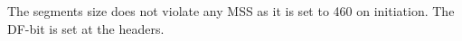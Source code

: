 The segments size does not violate any MSS as it is set to 460 on initiation.
The DF-bit is set at the headers.